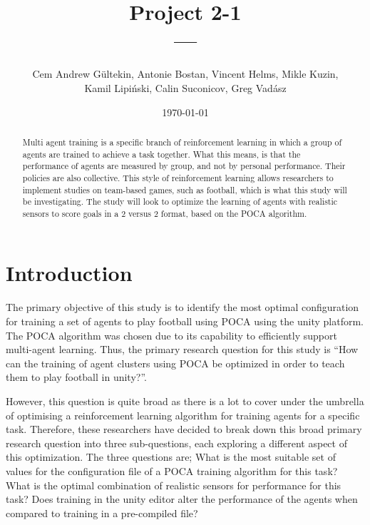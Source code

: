 \documentclass{LSkill}
\title{Project 2-1 \\ \large{---}}
\author{
    Cem Andrew Gültekin, Antonie Bostan, Vincent Helms, Mikle Kuzin, \\ 
    Kamil Lipiński, Calin Suconicov, Greg Vadász
}
\date{\today}
\begin{document}
\maketitle
\tableofcontents

\begin{abstract}
Multi agent training is a specific branch of reinforcement learning in which a group of agents are trained to achieve a task together. What this means, is that the performance of agents are measured by group, and not by personal performance. Their policies are also collective. This style of reinforcement learning allows researchers to implement studies on team-based games, such as football, which is what this study will be investigating. The study will look to optimize the learning of agents with realistic sensors to score goals in a 2 versus 2 format, based on the POCA algorithm. 
\end{abstract}

\section{Introduction}
The primary objective of this study is to identify the most optimal configuration for training a set of agents to play football using POCA using the unity platform. The POCA algorithm was chosen due to its capability to efficiently support multi-agent learning. Thus, the primary research question for this study is “How can the training of agent clusters using POCA be optimized in order to teach them to play football in unity?”.

However, this question is quite broad as there is a lot to cover under the umbrella of optimising a reinforcement learning algorithm for training agents for a specific task. Therefore, these researchers have decided to break down this broad primary research question into three sub-questions, each exploring a different aspect of this optimization. The three questions are; What is the most suitable set of values for the configuration file of a POCA training algorithm for this task? What is the optimal combination of realistic sensors for performance for this task? Does training in the unity editor alter the performance of the agents when compared to training in a pre-compiled file? 
\end{document}
